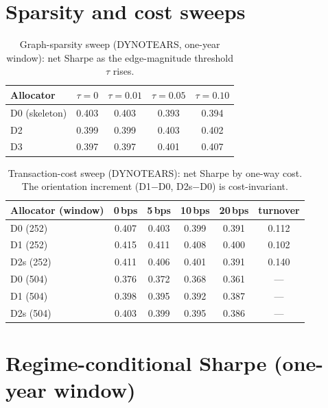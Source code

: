 \section{Sparsity and cost sweeps}

\begin{table}[h]
  \centering
  \caption{Graph-sparsity sweep (DYNOTEARS, one-year window): net Sharpe as
    the edge-magnitude threshold $\tau$ rises.}
  \label{tab:tau}
  \begin{tabular}{l c c c c}
    \toprule
    Allocator & $\tau=0$ & $\tau=0.01$ & $\tau=0.05$ & $\tau=0.10$ \\
    \midrule
    D0 (skeleton) & 0.403 & 0.403 & 0.393 & 0.394 \\
    D2            & 0.399 & 0.399 & 0.403 & 0.402 \\
    D3            & 0.397 & 0.397 & 0.401 & 0.407 \\
    \bottomrule
  \end{tabular}
\end{table}

\begin{table}[h]
  \centering
  \caption{Transaction-cost sweep (DYNOTEARS): net Sharpe by one-way cost.
    The orientation increment (D1$-$D0, D2s$-$D0) is cost-invariant.}
  \label{tab:cost}
  \begin{tabular}{l c c c c c}
    \toprule
    Allocator (window) & 0\,bps & 5\,bps & 10\,bps & 20\,bps & turnover \\
    \midrule
    D0 (252)  & 0.407 & 0.403 & 0.399 & 0.391 & 0.112 \\
    D1 (252)  & 0.415 & 0.411 & 0.408 & 0.400 & 0.102 \\
    D2s (252) & 0.411 & 0.406 & 0.401 & 0.391 & 0.140 \\
    D0 (504)  & 0.376 & 0.372 & 0.368 & 0.361 & --- \\
    D1 (504)  & 0.398 & 0.395 & 0.392 & 0.387 & --- \\
    D2s (504) & 0.403 & 0.399 & 0.395 & 0.386 & --- \\
    \bottomrule
  \end{tabular}
\end{table}

\section{Regime-conditional Sharpe (one-year window)}

